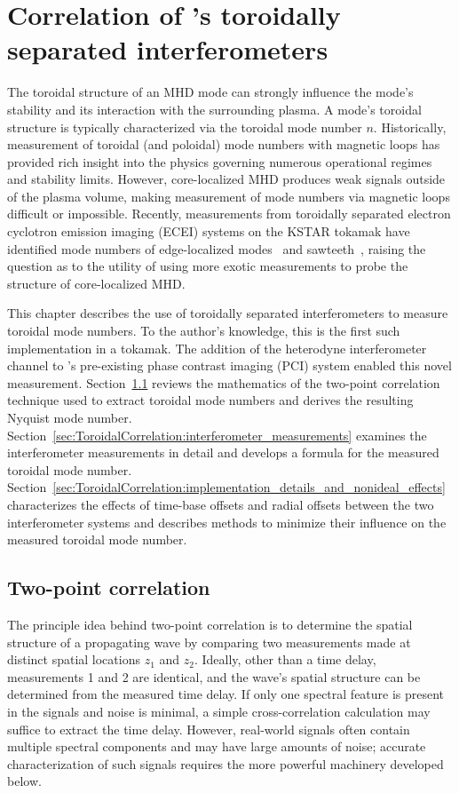 \chapter{Correlation of \diiid's toroidally separated interferometers}
The toroidal structure of an MHD mode can strongly influence
the mode's stability and its interaction with the surrounding plasma.
A mode's toroidal structure is typically characterized
via the toroidal mode number $n$.
Historically, measurement of toroidal (and poloidal) mode numbers
with magnetic loops has provided rich insight
into the physics governing numerous operational regimes and stability limits.
However, core-localized MHD produces weak signals outside of the plasma volume,
making measurement of mode numbers via magnetic loops difficult or impossible.
Recently, measurements from toroidally separated
electron cyclotron emission imaging (ECEI) systems
on the KSTAR tokamak have identified mode numbers of
edge-localized modes~\cite{lee_rsi_2014} and
sawteeth~\cite{choe_nf_2015},
raising the question as to the utility of using more exotic measurements
to probe the structure of core-localized MHD.

This chapter describes the use of toroidally separated interferometers
to measure toroidal mode numbers.
To the author's knowledge, this is the first such implementation in a tokamak.
The addition of the heterodyne interferometer channel
to \diiid's pre-existing phase contrast imaging (PCI) system
enabled this novel measurement.
Section~\ref{sec:ToroidalCorrelation:two_point_correlation}
reviews the mathematics of the two-point correlation technique
used to extract toroidal mode numbers and
derives the resulting Nyquist mode number.
Section~\ref{sec:ToroidalCorrelation:interferometer_measurements}
examines the interferometer measurements in detail and
develops a formula for the measured toroidal mode number.
Section~\ref{sec:ToroidalCorrelation:implementation_details_and_nonideal_effects}
characterizes the effects of time-base offsets and radial offsets
between the two interferometer systems and
describes methods to minimize their influence
on the measured toroidal mode number.


\section{Two-point correlation}
\label{sec:ToroidalCorrelation:two_point_correlation}
The principle idea behind two-point correlation
is to determine the spatial structure of a propagating wave
by comparing two measurements made
at distinct spatial locations $z_1$ and $z_2$.
Ideally, other than a time delay, measurements 1 and 2 are identical, and
the wave's spatial structure can be determined from the measured time delay.
If only one spectral feature is present in the signals and noise is minimal,
a simple cross-correlation calculation may suffice to extract the time delay.
However, real-world signals often contain multiple spectral components and
may have large amounts of noise;
accurate characterization of such signals requires the more powerful
machinery developed below.

